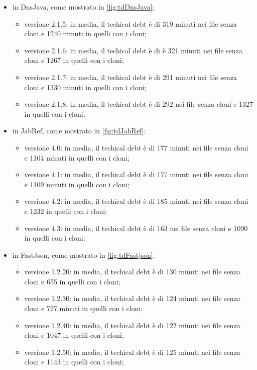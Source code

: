 \begin{itemize}
		\item in DnsJava, come mostrato in \autoref{fig:tdDnsJava}:
	\begin{itemize}
		\item versione 2.1.5: in media, il techical debt è di 319 minuti nei file senza cloni e 1240 minuti in quelli con i cloni;
		\item versione 2.1.6: in media, il techical debt è di è 321 minuti nei file senza cloni e 1267 in quelli con i cloni;
		\item versione 2.1.7: in media, il techical debt è di 291 minuti nei file senza cloni e 1330 minuti in quelli con i cloni;
		\item versione 2.1.8: in media, il techical debt è di 292 nei file senza cloni e 1327 in quelli con i cloni;
	\end{itemize}
	\item in JabRef, come mostrato in \autoref{fig:tdJabRef}:
	\begin{itemize}
		\item versione 4.0: in media, il techical debt è di 177 minuti nei file senza cloni e 1104 minuti in quelli con i cloni;
		\item versione 4.1: in media, il techical debt è di 177 minuti nei file senza cloni e 1109 minuti in quelli con i cloni;
		\item versione 4.2: in media, il techical debt è di 185 minuti nei file senza cloni e 1232 in quelli con i cloni;
		\item versione 4.3: in media, il techical debt è di 163 nei file senza cloni e 1090 in quelli con i cloni;
	\end{itemize} 
		\item in FastJson, come mostrato in \autoref{fig:tdFastjson}:
	\begin{itemize}
		\item versione 1.2.20: in media, il techical debt è di 130 minuti nei file senza cloni e 655 in quelli con i cloni;
		\item versione 1.2.30: in media, il techical debt è di 124 minuti nei file senza cloni e 727 minuti in quelli con i cloni;
		\item versione 1.2.40: in media, il techical debt è di 122 minuti nei file senza cloni e 1047 in quelli con i cloni;
		\item versione 1.2.50: in media, il techical debt è di 125 minuti nei file senza cloni e 1143 in quelli con i cloni;
	\end{itemize}
\end{itemize}
